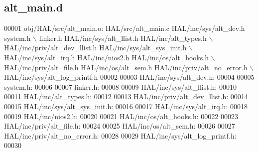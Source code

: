 \subsection{alt\+\_\+main.\+d}
\label{alt__main_8d_source}

\begin{DoxyCode}
00001 obj/HAL/src/alt_main.o: HAL/src/alt_main.c HAL/inc/sys/alt_dev.h system.h \(\backslash\)
 linker.h HAL/inc/sys/alt_llist.h HAL/inc/alt\_types.h \(\backslash\)
 HAL/inc/priv/alt_dev_llist.h HAL/inc/sys/alt_sys_init.h \(\backslash\)
 HAL/inc/sys/alt_irq.h HAL/inc/nios2.h HAL/inc/os/alt\_hooks.h \(\backslash\)
 HAL/inc/priv/alt\_file.h HAL/inc/os/alt\_sem.h HAL/inc/priv/alt_no_error.h \(\backslash\)
 HAL/inc/sys/alt\_log\_printf.h
00002 
00003 HAL/inc/sys/alt_dev.h:
00004 
00005 system.h:
00006 
00007 linker.h:
00008 
00009 HAL/inc/sys/alt_llist.h:
00010 
00011 HAL/inc/alt\_types.h:
00012 
00013 HAL/inc/priv/alt_dev_llist.h:
00014 
00015 HAL/inc/sys/alt_sys_init.h:
00016 
00017 HAL/inc/sys/alt_irq.h:
00018 
00019 HAL/inc/nios2.h:
00020 
00021 HAL/inc/os/alt\_hooks.h:
00022 
00023 HAL/inc/priv/alt\_file.h:
00024 
00025 HAL/inc/os/alt\_sem.h:
00026 
00027 HAL/inc/priv/alt_no_error.h:
00028 
00029 HAL/inc/sys/alt\_log\_printf.h:
00030 \end{DoxyCode}
